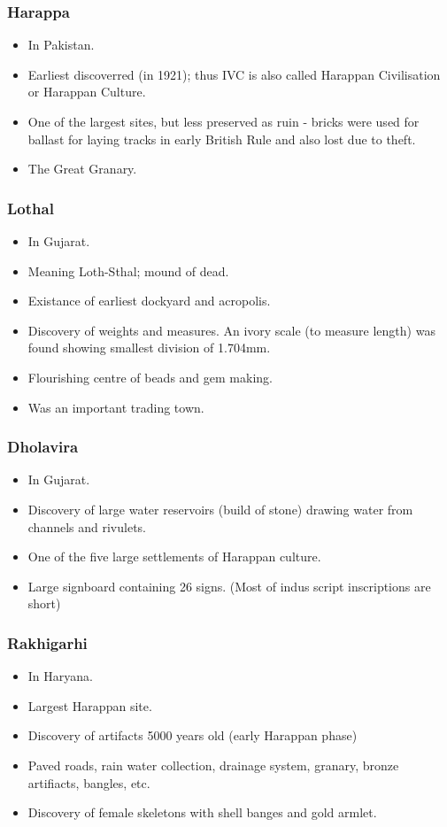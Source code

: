 \documentclass[8pt, a4paper, oneside, twocolumn]{extarticle}
\begin{document}
\subsubsection{Harappa}
\begin{itemize}
  \item In Pakistan.
  \item Earliest discoverred (in 1921); thus IVC is also called Harappan Civilisation or Harappan Culture.
  \item One of the largest sites, but less preserved as ruin - bricks were used for ballast for laying tracks in early British Rule and also lost due to theft.
  \item The Great Granary.
\end{itemize}
\subsubsection{Lothal}
\begin{itemize}
  \item In Gujarat.
  \item Meaning Loth-Sthal; mound of dead.
  \item Existance of earliest dockyard and acropolis.
  \item Discovery of weights and measures. An ivory scale (to measure length) was found showing smallest division of 1.704mm.
  \item Flourishing centre of beads and gem making.
  \item Was an important trading town.
\end{itemize}
\subsubsection{Dholavira}
\begin{itemize}
  \item In Gujarat.
  \item Discovery of large water reservoirs (build of stone) drawing water from channels and rivulets.
  \item One of the five large settlements of Harappan culture.
  \item Large signboard containing 26 signs. (Most of indus script inscriptions are short)
\end{itemize}
\subsubsection{Rakhigarhi}
\begin{itemize}
  \item In Haryana.
  \item Largest Harappan site.
  \item Discovery of artifacts 5000 years old (early Harappan phase)
  \item Paved roads, rain water collection, drainage system, granary, bronze artifiacts, bangles, etc.
  \item Discovery of female skeletons with shell banges and gold armlet.
\end{itemize}
\end{document}
